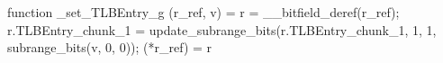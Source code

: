 function _set_TLBEntry_g (r_ref, v) = {
    r = __bitfield_deref(r_ref);
    r.TLBEntry_chunk_1 = update_subrange_bits(r.TLBEntry_chunk_1, 1, 1, subrange_bits(v, 0, 0));
    (*r_ref) = r
}
